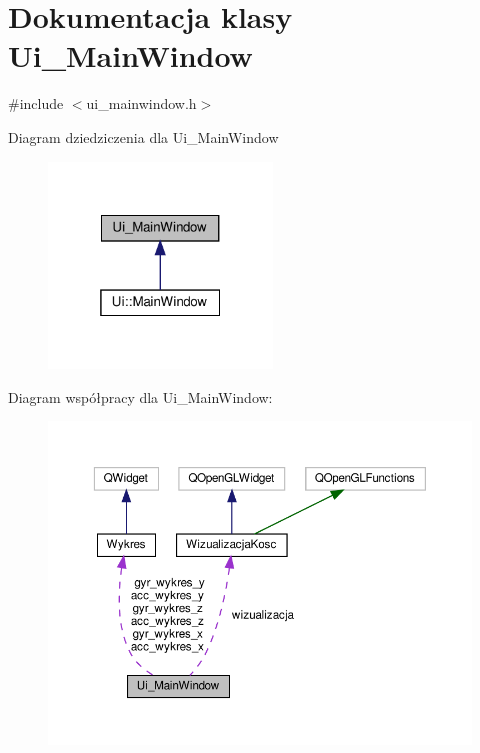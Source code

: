 \hypertarget{class_ui___main_window}{}\section{Dokumentacja klasy Ui\+\_\+\+Main\+Window}
\label{class_ui___main_window}


{\ttfamily \#include $<$ui\+\_\+mainwindow.\+h$>$}



Diagram dziedziczenia dla Ui\+\_\+\+Main\+Window\nopagebreak
\begin{figure}[H]
\begin{center}
\leavevmode
\includegraphics[width=169pt]{class_ui___main_window__inherit__graph}
\end{center}
\end{figure}


Diagram współpracy dla Ui\+\_\+\+Main\+Window\+:
\nopagebreak
\begin{figure}[H]
\begin{center}
\leavevmode
\includegraphics[width=350pt]{class_ui___main_window__coll__graph}
\end{center}
\end{figure}
